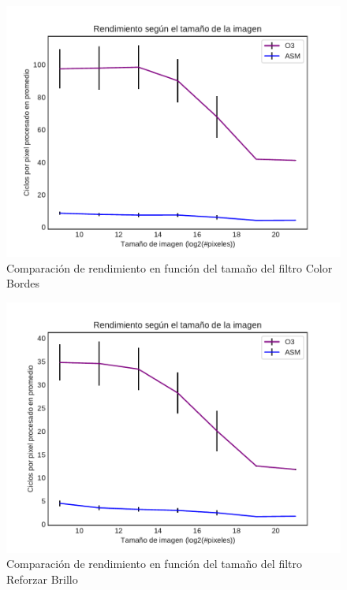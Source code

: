 \documentclass[a4paper]{article}
\begin{document}
\begin{figure}[h!]
	\centering
	\includegraphics[scale=0.56]{img/ColorBordesO3vsASM.pdf}
	\caption{Comparación de rendimiento en función del tamaño del filtro Color Bordes}
\end{figure}	


\begin{figure}[h!]
	\centering
	\includegraphics[scale=0.56]{img/ReforzarBrilloO3vsASM.pdf}
	\caption{Comparación de rendimiento en función del tamaño del filtro Reforzar Brillo}
\end{figure}
\end{document}
